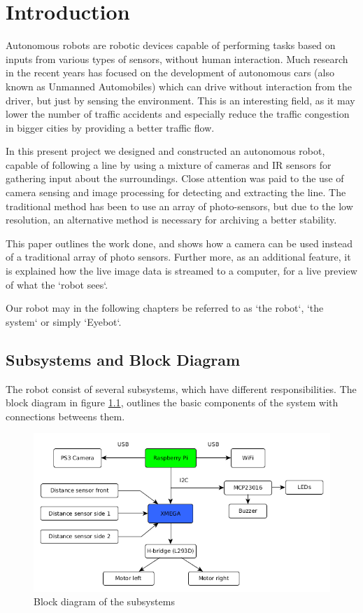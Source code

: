 \chapter{Introduction}

Autonomous robots are robotic devices capable of performing tasks based on inputs from various types of sensors, without human interaction. Much research in the recent years has focused on the development of autonomous cars (also known as Unmanned Automobiles) which can drive without interaction from the driver, but just by sensing the environment. This is an interesting field, as it may lower the number of traffic accidents and especially reduce the traffic congestion in bigger cities by providing a better traffic flow.

In this present project we designed and constructed an autonomous robot, capable of following a line by using a mixture of cameras and IR sensors for gathering input about the surroundings. Close attention was paid to the use of camera sensing and image processing for detecting and extracting the line. The traditional method has been to use an array of photo-sensors, but due to the low resolution, an alternative method is necessary for archiving a better stability.

This paper outlines the work done, and shows how a camera can be used instead of a traditional array of photo sensors. Further more, as an additional feature, it is explained how the live image data is streamed to a computer, for a live preview of what the `robot sees`.

Our robot may in the following chapters be referred to as `the robot`, `the system` or simply `Eyebot`.

%
%
%
%
\section{Subsystems and Block Diagram}

The robot consist of several subsystems, which have different responsibilities. The block diagram in figure \ref{fig:intro_1}, outlines the basic components of the system with connections betweens them. 

\begin{figure}[!ht]
	\centering
	\includegraphics[width=1\textwidth]{resources/Blockdiagram}
	\caption{Block diagram of the subsystems}
	\label{fig:intro_1}
\end{figure}

